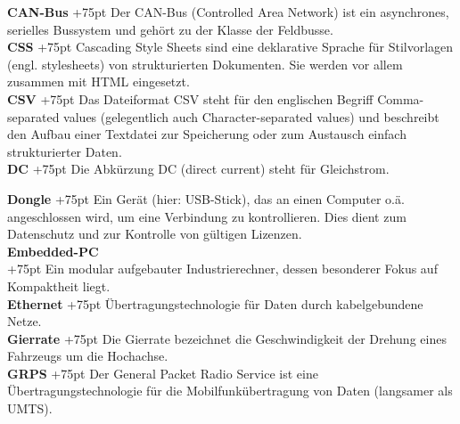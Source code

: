 \documentclass[fontsize = 12pt, paper = a4]{scrreprt}
\begin{document}
\textbf{CAN-Bus}
\hangindent+75pt 
\hspace*{3mm} 
Der CAN-Bus (Controlled Area Network) ist ein asynchrones, serielles Bussystem und gehört zu der Klasse der Feldbusse.\\

\textbf{CSS}
\hangindent+75pt 
\hspace*{15mm}
Cascading Style Sheets sind eine deklarative Sprache für Stilvorlagen (engl. stylesheets) von strukturierten Dokumenten. Sie werden vor allem zusammen mit HTML eingesetzt.\\


\textbf{CSV}
\hangindent+75pt 
\hspace*{13.5mm}
Das Dateiformat CSV steht für den englischen Begriff Comma-separated values (gelegentlich auch Character-separated values) und beschreibt den Aufbau einer Textdatei zur Speicherung oder zum Austausch einfach strukturierter Daten.\\

\textbf{DC}
\hangindent+75pt 
\hspace*{16.5mm}
Die Abkürzung DC (direct current) steht für Gleichstrom.\\

\newpage

\textbf{Dongle}
\hangindent+75pt 
\hspace*{8.75mm}
Ein Gerät (hier: USB-Stick), das an einen Computer o.ä. angeschlossen wird, um eine Verbindung zu kontrollieren. Dies dient zum Datenschutz und zur Kontrolle von gültigen Lizenzen.\\

\textbf{Embedded-PC} \\
\hangindent+75pt  
Ein modular aufgebauter Industrierechner, dessen besonderer Fokus auf Kompaktheit liegt.\\

\textbf{Ethernet}
\hangindent+75pt 
\hspace*{5.5mm}
Übertragungstechnologie für Daten durch kabelgebundene Netze.\\

\textbf{Gierrate}
\hangindent+75pt 
\hspace*{6.5mm}
Die Gierrate bezeichnet die Geschwindigkeit der Drehung eines Fahrzeugs um die Hochachse.\\

\textbf{GRPS}
\hangindent+75pt 
\hspace*{10.5mm}
Der General Packet Radio Service ist eine Übertragungstechnologie für die Mobilfunkübertragung von Daten (langsamer als UMTS).\\
\end{document}
